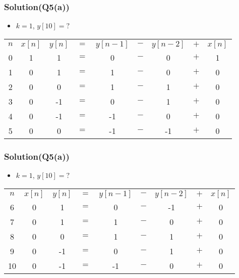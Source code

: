 \documentclass{beamer}
\begin{document}
\begin{frame}
\frametitle{Solution(Q5(a))}

\begin{itemize} \itemsep1pt \parskip0pt 
  \item[] $k=1$, $y[10]=?$
\end{itemize}

\begin{table}
\def\arraystretch{1.5}
\begin{tabular}{ccccccccc}
\hline
$n$ & $x[n]$ & $y[n]$ & $=$ & $y[n-1]$ & $-$ & $y[n-2]$ & $+$ & $x[n]$ \\

0 & 1 & 1 & $=$ & 0 & $-$ & 0 & $+$ & 1 \\ 

1 & 0 & 1 & $=$ & 1 & $-$ & 0 & $+$ & 0 \\ 

2 & 0 & 0 & $=$ & 1 & $-$ & 1 & $+$ & 0 \\ 

3 & 0 & -1 & $=$ & 0 & $-$ & 1 & $+$ & 0 \\ 

4 & 0 & -1 & $=$ & -1 & $-$ & 0 & $+$ & 0 \\

5 & 0 & 0 & $=$ & -1 & $-$ & -1 & $+$ & 0 \\ 

\hline
\end{tabular}
\end{table}

\end{frame}


\begin{frame}
\frametitle{Solution(Q5(a))}

\begin{itemize} \itemsep1pt \parskip0pt 
  \item[] $k=1$, $y[10]=?$
\end{itemize}

\begin{table}
\def\arraystretch{1.5}
\begin{tabular}{ccccccccc}
\hline
$n$ & $x[n]$ & $y[n]$ & $=$ & $y[n-1]$ & $-$ & $y[n-2]$ & $+$ & $x[n]$ \\

6 & 0 & 1 & $=$ & 0 & $-$ & -1 & $+$ & 0 \\ 

7 & 0 & 1 & $=$ & 1 & $-$ & 0 & $+$ & 0 \\ 

8 & 0 & 0 & $=$ & 1 & $-$ & 1 & $+$ & 0 \\ 

9 & 0 & -1 & $=$ & 0 & $-$ & 1 & $+$ & 0 \\ 

10 & 0 & -1 & $=$ & -1 & $-$ & 0 & $+$ & 0 \\

\hline
\end{tabular}
\end{table}

\end{frame}
\end{document}
